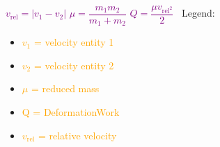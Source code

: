 \documentclass[main.tex,fontsize=8pt,paper=a4,paper=portrait,DIV=calc,]{scrartcl}
\begin{document}
\begin{multicols*}{2}
\subsubsection{}
\vspace{2mm}
\large \textcolor{purple}{\(v_{\text{rel}} = | v_1 - v_2|\)}\newline
\textcolor{purple}{\(\mu = \dfrac{m_1m_2}{m_1 + m_2}\)}\newline
\textcolor{purple}{\( Q = \dfrac{\mu v_{\text{rel}^2}}{2}\)}\newline
\normalsize \, \newline
Legend:\newline
\begin{itemize}
\item \textcolor{orange}{\(v_1\) = velocity entity 1}
\item \textcolor{orange}{\(v_2\) = velocity entity 2}
\item \textcolor{orange}{\(\mu\) = reduced mass}
\item \textcolor{orange}{Q = DeformationWork}
\item \textcolor{orange}{\(v_{\text{rel}}\) = relative velocity}
\end{itemize}



\end{multicols*}
\end{document}
